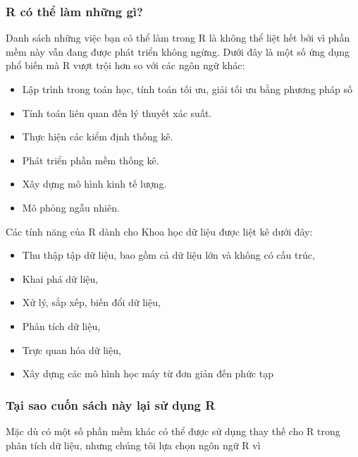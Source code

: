 \documentclass[
]{article}
\begin{document}
\hypertarget{r-cuxf3-thux1ec3-luxe0m-nhux1eefng-guxec}{%
\subsubsection{R có thể làm những gì?}\label{r-cuxf3-thux1ec3-luxe0m-nhux1eefng-guxec}}

Danh sách những việc bạn có thể làm trong R là không thể liệt hết bởi vì phần mềm này vẫn đang được phát triển không ngừng. Dưới đây là một số ứng dụng phổ biến mà R vượt trội hơn so với các ngôn ngữ khác:

\begin{itemize}
\item
  Lập trình trong toán học, tính toán tối ưu, giải tối ưu bằng phương pháp số
\item
  Tính toán liên quan đến lý thuyết xác suất.
\item
  Thực hiện các kiểm định thống kê.
\item
  Phát triển phần mềm thống kê.
\item
  Xây dựng mô hình kinh tế lượng.
\item
  Mô phỏng ngẫu nhiên.
\end{itemize}

Các tính năng của R dành cho Khoa học dữ liệu được liệt kê dưới đây:

\begin{itemize}
\item
  Thu thập tập dữ liệu, bao gồm cả dữ liệu lớn và không có cấu trúc,
\item
  Khai phá dữ liệu,
\item
  Xử lý, sắp xếp, biến đổi dữ liệu,
\item
  Phân tích dữ liệu,
\item
  Trực quan hóa dữ liệu,
\item
  Xây dựng các mô hình học máy từ đơn giản đến phức tạp
\end{itemize}

\hypertarget{tux1ea1i-sao-cuux1ed1n-suxe1ch-nuxe0y-lux1ea1i-sux1eed-dux1ee5ng-r}{%
\subsubsection{Tại sao cuốn sách này lại sử dụng R}\label{tux1ea1i-sao-cuux1ed1n-suxe1ch-nuxe0y-lux1ea1i-sux1eed-dux1ee5ng-r}}

Mặc dù có một số phần mềm khác có thể được sử dụng thay thế cho R trong phân tích dữ liệu, nhưng chúng tôi lựa chọn ngôn ngữ R vì
\end{document}
